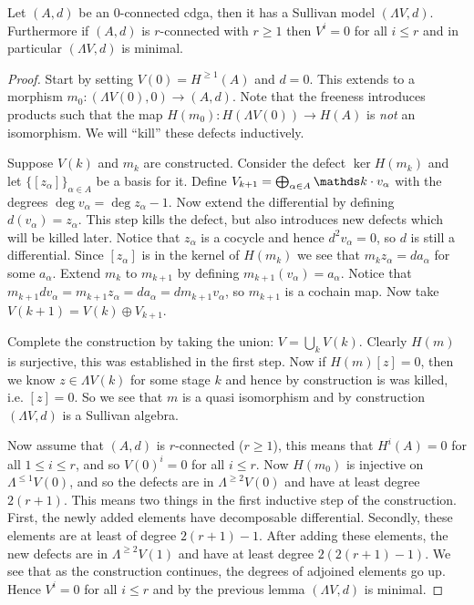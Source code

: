 \begin{theorem}
	Let $(A, d)$ be an $0$-connected cdga, then it has a Sullivan model $(\Lambda V, d)$. Furthermore if $(A, d)$ is $r$-connected with $r \geq 1$ then $V^i = 0$ for all $i \leq r$ and in particular $(\Lambda V, d)$ is minimal.
\end{theorem}
\begin{proof}
	Start by setting $V(0) = H^{\geq 1}(A)$ and $d = 0$. This extends to a morphism $m_0 : (\Lambda V(0), 0) \to (A, d)$.
	Note that the freeness introduces products such that the map $H(m_0) : H(\Lambda V(0)) \to H(A)$ is \emph{not} an isomorphism. We will ``kill'' these defects inductively.

	Suppose $V(k)$ and $m_k$ are constructed. Consider the defect $\ker H(m_k)$ and let $\{[z_\alpha]\}_{\alpha \in A}$ be a basis for it. Define $V_{k+1} = \bigoplus_{\alpha \in A} \k \cdot v_\alpha$ with the degrees $\deg{v_\alpha} = \deg{z_\alpha}-1$.
	Now extend the differential by defining $d(v_\alpha) = z_\alpha$. This step kills the defect, but also introduces new defects which will be killed later. Notice that $z_\alpha$ is a cocycle and hence $d^2 v_\alpha = 0$, so $d$ is still a differential.
	Since $[z_\alpha]$ is in the kernel of $H(m_k)$ we see that $m_k z_\alpha = d a_\alpha$ for some $a_\alpha$. Extend $m_k$ to $m_{k+1}$ by defining $m_{k+1}(v_\alpha) = a_\alpha$. Notice that $m_{k+1} d v_\alpha = m_{k+1} z_\alpha = d a_\alpha = d m_{k+1} v_\alpha$, so $m_{k+1}$ is a cochain map.
	Now take $V(k+1) = V(k) \oplus V_{k+1}$.

	Complete the construction by taking the union: $V = \bigcup_k V(k)$. Clearly $H(m)$ is surjective, this was established in the first step. Now if $H(m)[z] = 0$, then we know $z \in \Lambda V(k)$ for some stage $k$ and hence by construction is was killed, i.e. $[z] = 0$. So we see that $m$ is a quasi isomorphism and by construction $(\Lambda V, d)$ is a Sullivan algebra.

	Now assume that $(A, d)$ is $r$-connected ($r \geq 1$), this means that $H^i(A) = 0$ for all $1 \leq i \leq r$, and so $V(0)^i = 0$ for all $i \leq r$. Now $H(m_0)$ is injective on $\Lambda^{\leq 1} V(0)$, and so the defects are in $\Lambda^{\geq 2} V(0)$ and have at least degree $2(r+1)$. This means two things in the first inductive step of the construction. First, the newly added elements have decomposable differential. Secondly, these elements are at least of degree $2(r+1) - 1$. After adding these elements, the new defects are in $\Lambda^{\geq 2} V(1)$ and have at least degree $2(2(r+1) - 1)$. We see that as the construction continues, the degrees of adjoined elements go up. Hence $V^i = 0$ for all $i \leq r$ and by the previous lemma $(\Lambda V, d)$ is minimal.
\end{proof}


